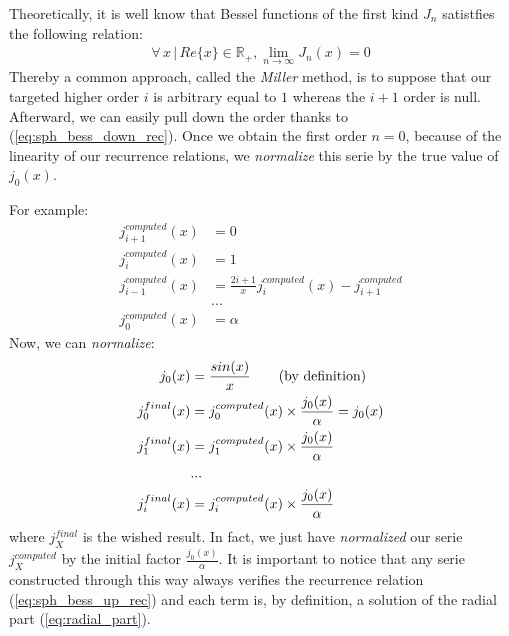 \documentclass{article}
\numberwithin{equation}{section}
\begin{document}
Theoretically, it is well know that Bessel functions of the first kind $J_{n}$ satistfies the following relation:
\begin{align}
\forall\,x\,|\,Re\{x\} \in\mathbb{R}_{+}, \lim_{n \to \infty } J_{n}(x)=0
\end{align}
Thereby a common approach, called the \textit{Miller} method, is to suppose that our targeted higher order $i$ is arbitrary equal to $1$ whereas the $i+1$ order is null. Afterward, we can easily pull down the order thanks to (\ref{eq:sph_bess_down_rec}). Once we obtain the first order $n=0$, because of the linearity of our recurrence relations, we \textit{normalize} this serie by the true value of $j_{0}(x)$. 

For example:
\begin{equation}\label{eq:j_computed}
\begin{aligned}
j^{computed}_{i+1}(x) &= 0\\
j^{computed}_{i}(x) &= 1\\
j^{computed}_{i-1}(x) &= \frac{2i+1}{x}j^{computed}_{i}(x) - j^{computed}_{i+1}\\
&...\\
j^{computed}_{0}(x) &= \alpha
\end{aligned}
\end{equation}
Now, we can \textit{normalize}:
\begin{equation}\label{eq:j_final}
\begin{aligned}
j_{0}(x) &= \frac{sin(x)}{x} \qquad\textnormal{(by definition)}\\
j^{final}_{0}(x) &= j^{computed}_{0}(x) \times \frac{j_{0}(x)}{\alpha} = j_{0}(x)\\
j^{final}_{1}(x) &= j^{computed}_{1}(x) \times \frac{j_{0}(x)}{\alpha}\\
&...\\
j^{final}_{i}(x) &= j^{computed}_{i}(x) \times \frac{j_{0}(x)}{\alpha}\\
\end{aligned}
\end{equation}
where $j^{final}_{X}$ is the wished result. In fact, we just have \textit{normalized} our serie $j^{computed}_{X}$ by the initial factor $\frac{j_{0}(x)}{\alpha}$. It is important to notice that any serie constructed through this way always verifies the recurrence relation (\ref{eq:sph_bess_up_rec}) and each term is, by definition, a solution of the radial part (\ref{eq:radial_part}).
\end{document}
